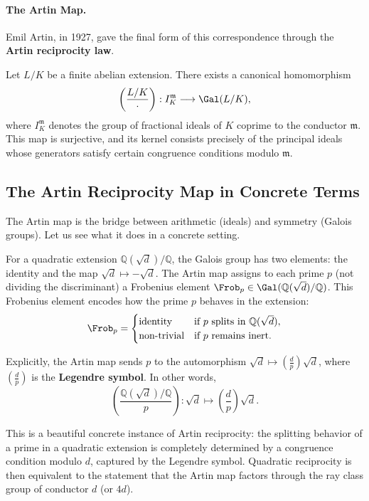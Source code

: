 \paragraph{The Artin Map.} Emil Artin, in 1927, gave the final form of this correspondence through the \textbf{Artin reciprocity law}.

\begin{theorem}\label{thm:artin-reciprocity-cft}
Let $L/K$ be a finite abelian extension. There exists a canonical homomorphism
\[
\left(\frac{L/K}{\cdot}\right) : I_K^{\mathfrak{m}} \longrightarrow \Gal(L/K),
\]
where $I_K^{\mathfrak{m}}$ denotes the group of fractional ideals of $K$ coprime to the conductor $\mathfrak{m}$. This map is surjective, and its kernel consists precisely of the principal ideals whose generators satisfy certain congruence conditions modulo $\mathfrak{m}$.
\end{theorem}

\subsection{The Artin Reciprocity Map in Concrete Terms}

The Artin map is the bridge between arithmetic (ideals) and symmetry (Galois groups). Let us see what it does in a concrete setting.

For a quadratic extension $\mathbb{Q}(\sqrt{d})/\mathbb{Q}$, the Galois group has two elements: the identity and the map $\sqrt{d} \mapsto -\sqrt{d}$. The Artin map assigns to each prime $p$ (not dividing the discriminant) a Frobenius element $\Frob_p \in \Gal(\mathbb{Q}(\sqrt{d})/\mathbb{Q})$. This Frobenius element encodes how the prime $p$ behaves in the extension:
\[
\Frob_p = \begin{cases}
\text{identity} & \text{if $p$ splits in $\mathbb{Q}(\sqrt{d})$},\\
\text{non-trivial} & \text{if $p$ remains inert}.
\end{cases}
\]

Explicitly, the Artin map sends $p$ to the automorphism $\sqrt{d} \mapsto \left(\frac{d}{p}\right)\sqrt{d}$, where $\left(\frac{d}{p}\right)$ is the \textbf{Legendre symbol}. In other words,
\[
\left(\frac{\mathbb{Q}(\sqrt{d})/\mathbb{Q}}{p}\right) : \sqrt{d} \longmapsto \left(\frac{d}{p}\right)\sqrt{d}.
\]

This is a beautiful concrete instance of Artin reciprocity: the splitting behavior of a prime in a quadratic extension is completely determined by a congruence condition modulo $d$, captured by the Legendre symbol. Quadratic reciprocity is then equivalent to the statement that the Artin map factors through the ray class group of conductor $d$ (or $4d$).

